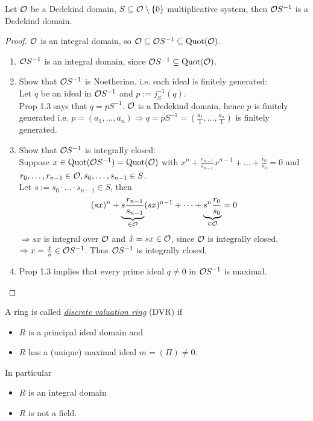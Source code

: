 \begin{Prop}
Let $\mathcal{O}$ be a Dedekind domain, $S \subseteq \mathcal{O}\setminus \{0\}$ multiplicative system, then $\mathcal{O} S^{-1}$ is a Dedekind domain.
\end{Prop}

\begin{proof}
$\mathcal{O}$ is an integral domain, so $\mathcal{O} \subseteq \mathcal{O} S^{-1} \subseteq \operatorname{Quot}(\mathcal{O})$.
\begin{enumerate}[(1)]
\item $\mathcal{O} S^{-1}$ is an integral domain, since $\mathcal{O} S^{-1} \subseteq \operatorname{Quot}(\mathcal{O})$.
\item Show that $\mathcal{O} S^{-1}$ is Noetherian, i.e. each ideal is finitely generated:\\
Let $q$ be an ideal in $\mathcal{O} S^{-1}$ and $p:=j_S^{-1}(q)$.\\
Prop 1.3 says that $q=pS^{-1}$. $\mathcal{O}$ is a Dedekind domain, hence $p$ is finitely generated i.e. $p=(a_1, \dots, a_n) \Rightarrow q=pS^{-1}=(\frac{a_1}{1}, \dots, \frac{a_n}{1})$ is finitely generated.
\item Show that $\mathcal{O} S^{-1}$ is integrally closed:\\
Suppose $x \in \operatorname{Quot}(\mathcal{O} S^{-1})=\operatorname{Quot}(\mathcal{O})$ with $x^n+\frac{r_{n-1}}{s_{n-1}} x^{n-1}+\dots+\frac{r_0}{s_0}=0$ and $r_0, \dots, r_{n-1} \in \mathcal{O}, s_0, \dots, s_{n-1} \in S$.\\
Let $s:=s_0 \cdot \ldots \cdot s_{n-1} \in S$, then
\[(sx)^n + \underbrace{s\frac{r_{n-1}}{s_{n-1}}}_{\in \mathcal{O}} (sx)^{n-1} + \dots + \underbrace{s^n \frac{r_0}{s_0}}_{\in \mathcal{O}} =0\]
$\Rightarrow sx$ is integral over $\mathcal{O}$ and $\hat x = sx \in \mathcal{O}$, since $\mathcal{O}$ is integrally closed.\\
$\Rightarrow x = \frac{\hat x}{s} \in \mathcal{O} S^{-1}$. Thus $\mathcal{O} S^{-1}$ is integrally closed.
\item Prop 1.3 implies that every prime ideal $q \not= 0$ in $\mathcal{O} S^{-1}$ is maximal.
\end{enumerate}
\end{proof}

\begin{defi}
A ring is called \emph{\underline{discrete valuation ring}} (DVR) if
\begin{itemize}
\item $R$ is a principal ideal domain and
\item $R$ has a (unique) maximal ideal $m=(\Pi)\not = 0$.
\end{itemize}
In particular
\begin{itemize}
\item $R$ is an integral domain
\item $R$ is not a field.
\end{itemize}
\end{defi}